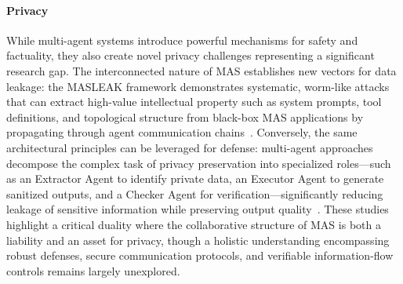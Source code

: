 \paragraph{Privacy}

While multi-agent systems introduce powerful mechanisms for safety and factuality, they also create novel privacy challenges representing a significant research gap. The interconnected nature of MAS establishes new vectors for data leakage: the MASLEAK framework demonstrates systematic, worm-like attacks that can extract high-value intellectual property such as system prompts, tool definitions, and topological structure from black-box MAS applications by propagating through agent communication chains~\citep{wang2025ipleakageattackstargeting}. Conversely, the same architectural principles can be leveraged for defense: multi-agent approaches decompose the complex task of privacy preservation into specialized roles---such as an Extractor Agent to identify private data, an Executor Agent to generate sanitized outputs, and a Checker Agent for verification---significantly reducing leakage of sensitive information while preserving output quality~\citep{li-etal-2025-1}. These studies highlight a critical duality where the collaborative structure of MAS is both a liability and an asset for privacy, though a holistic understanding encompassing robust defenses, secure communication protocols, and verifiable information-flow controls remains largely unexplored.
